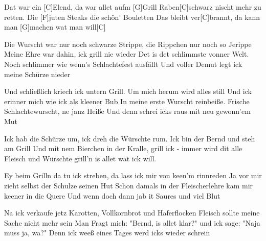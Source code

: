 \begin{guitar}
	Dat war ein [C]Elend, da war allet aufm [G]Grill
	Raben[C]schwarz nischt mehr zu retten. Die [F]juten Steaks die schön' Bouletten
	Das bleibt ver[C]brannt, da kann man [G]machen wat man will[C]{}
	
	Die Wurscht war nur noch schwarze Strippe, die Rippchen nur noch so Jerippe
	Meine Ehre war dahin, ick grill nie wieder
	Det is det schlimmste vonner Welt. Noch schlimmer wie wenn's Schlachtefest ausfällt\vspace{-.7em}
	Und voller Demut legt ick meine Schürze nieder
	
	Und schließlich kriech ick untern Grill. Um mich herum wird alles still
	Und ick erinner mich wie ick als kleener Bub
	In meine erste Wurscht reinbeiße. Frische Schlachtewurscht, ne janz Heiße
	Und denn schrei icks raus mit neu gewonn'em Mut
	
	\begin{highlightbar}
		Ick hab die Schürze um, ick dreh die Würschte rum.
		Ick bin der Bernd und steh am Grill
		Und mit nem Bierchen in der Kralle, grill ick - immer wird dit alle
		Fleisch und Würschte grill'n is allet wat ick will.
	\end{highlightbar}
	
	\songsection{Strophe 7}
	Ey beim Grilln da tu ick streben, da lass ick mir von keen'm rinnreden
	Ja vor mir zieht selbst der Schulze seinen Hut
	Schon damals in der Fleischerlehre kam mir keener in die Quere
	Und wenn doch dann jab it Saures und viel Blut
	
	Na ick verkaufe jetz Karotten, Vollkornbrot und Haferflocken
	Fleisch sollte meine Sache nicht mehr sein
	Man Fragt mich: "Bernd, is allet klar?" und ick sage: "Naja muss ja, wa?"
	Denn ick weeß eines Tages werd icks wieder schrein
	
	\begin{highlightbar}
		  \optionalChord{(x2)}
	\end{highlightbar}\vspace{-1.3em}
\end{guitar}